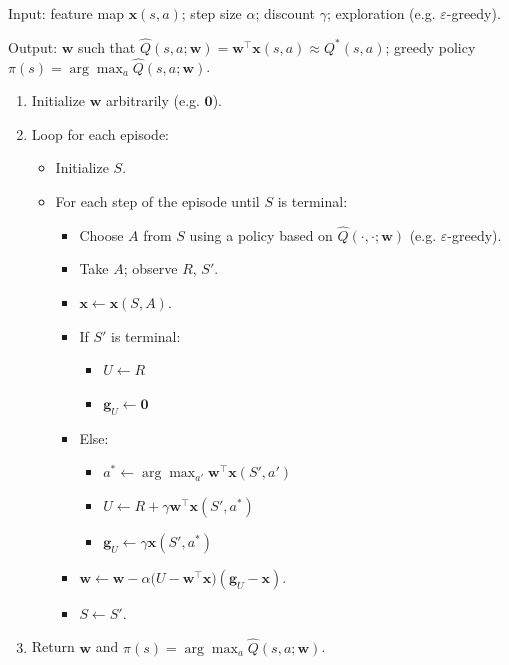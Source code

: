 \begin{implnote}
Input: feature map $\mathbf{x}(s,a)$; step size $\alpha$; discount $\gamma$; exploration (e.g. $\varepsilon$-greedy).

Output: $\mathbf{w}$ such that $\hat{Q}(s,a;\mathbf{w})=\mathbf{w}^\top\mathbf{x}(s,a)\approx Q^*(s,a)$; greedy policy $\pi(s)=\arg\max_a\hat{Q}(s,a;\mathbf{w})$.

\begin{enumerate}
\item Initialize $\mathbf{w}$ arbitrarily (e.g. $\mathbf{0}$).
\item Loop for each episode:
\begin{itemize}
\item Initialize $S$.
\item For each step of the episode until $S$ is terminal:
\begin{itemize}
\item Choose $A$ from $S$ using a policy based on $\hat{Q}(\cdot,\cdot;\mathbf{w})$ (e.g. $\varepsilon$-greedy).
\item Take $A$; observe $R$, $S'$.
\item $\mathbf{x}\leftarrow\mathbf{x}(S,A)$.
\item If $S'$ is terminal:
\begin{itemize}
\item $U\leftarrow R$
\item $\mathbf{g}_U\leftarrow\mathbf{0}$
\end{itemize}
\item Else:
\begin{itemize}
\item $a^*\leftarrow\arg\max_{a'}\mathbf{w}^\top\mathbf{x}(S',a')$
\item $U\leftarrow R+\gamma\mathbf{w}^\top\mathbf{x}(S',a^*)$
\item $\mathbf{g}_U\leftarrow\gamma\mathbf{x}(S',a^*)$
\end{itemize}
\item $\mathbf{w}\leftarrow\mathbf{w}-\alpha\bigl(U-\mathbf{w}^\top\mathbf{x}\bigr)(\mathbf{g}_U-\mathbf{x})$.
\item $S\leftarrow S'$.
\end{itemize}
\end{itemize}
\item Return $\mathbf{w}$ and $\pi(s)=\arg\max_a\hat{Q}(s,a;\mathbf{w})$.
\end{enumerate}

\end{implnote}

